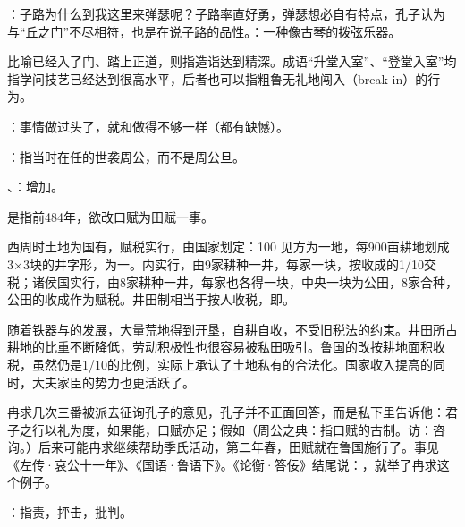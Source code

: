 {
\item {}：子路为什么到我这里来弹瑟呢？子路率直好勇，弹瑟想必自有特点，孔子认为与“丘之门”不尽相符，也是在说子路的品性。：一种像古琴的拨弦乐器。
\item {}比喻已经入了门、踏上正道，则指造诣达到精深。成语“升堂入室”、“登堂入室”均指学问技艺已经达到很高水平，后者也可以指粗鲁无礼地闯入（break in）的行为。
}
{}


{
\item {}：事情做过头了，就和做得不够一样（都有缺憾）。
}
{}  %


{
\item {}：指当时在任的世袭周公，而不是周公旦。
\item {}、：增加。

是指前484年，欲改口赋为田赋一事。

西周时土地为国有，赋税实行，由国家划定：100 见方为一地，每900亩耕地划成3×3块的井字形，为一。内实行，由9家耕种一井，每家一块，按收成的1/10交税；诸侯国实行，由8家耕种一井，每家也各得一块，中央一块为公田，8家合种，公田的收成作为赋税。井田制相当于按人收税，即。

随着铁器与的发展，大量荒地得到开垦，自耕自收，不受旧税法的约束。井田所占耕地的比重不断降低，劳动积极性也很容易被私田吸引。鲁国的改按耕地面积收税，虽然仍是1/10的比例，实际上承认了土地私有的合法化。国家收入提高的同时，大夫家臣的势力也更活跃了。

冉求几次三番被派去征询孔子的意见，孔子并不正面回答，而是私下里告诉他：君子之行以礼为度，如果能，口赋亦足；假如（周公之典：指口赋的古制。访：咨询。）后来可能冉求继续帮助季氏活动，第二年春，田赋就在鲁国施行了。事见《左传·哀公十一年》、《国语·鲁语下》。《论衡·答佞》结尾说：，就举了冉求这个例子。

\item {}：指责，抨击，批判。
}
{}


